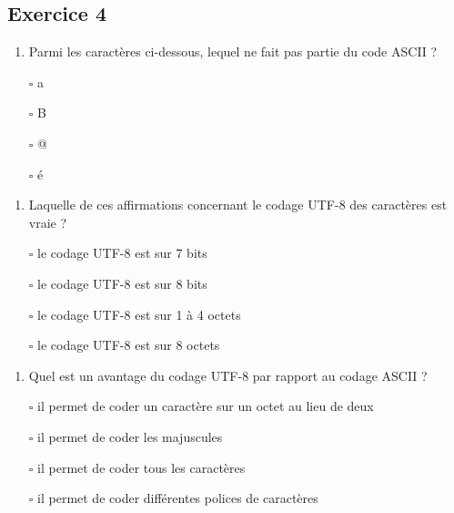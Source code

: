\documentclass[11pt,a4paper]{article}
\renewcommand{\theenumi}{\textbf{\arabic{enumi}}}
\renewcommand{\labelenumi}{\textbf{\theenumi.}}
\providecommand{\tightlist}{\setlength{\itemsep}{0pt}\setlength{\parskip}{0pt}}
\begin{document}
\hypertarget{octicons-pencil-16-exercice-4}{%
\subsection*{\faPencil* Exercice
4}\label{octicons-pencil-16-exercice-4}}

\begin{enumerate}
\def\labelenumi{\arabic{enumi}.}
\tightlist
\item
  Parmi les caractères ci-dessous, lequel ne fait pas partie du code
  ASCII ?
\end{enumerate}

\begin{itemize}
\tightlist
\item[$\square$]
  a
\item[$\square$]
  B
\item[$\square$]
  @
\item[$\square$]
  é
\end{itemize}

\begin{enumerate}
\def\labelenumi{\arabic{enumi}.}
\setcounter{enumi}{1}
\tightlist
\item
  Laquelle de ces affirmations concernant le codage UTF-8 des caractères
  est vraie ?
\end{enumerate}

\begin{itemize}
\tightlist
\item[$\square$]
  le codage UTF-8 est sur 7 bits
\item[$\square$]
  le codage UTF-8 est sur 8 bits
\item[$\square$]
  le codage UTF-8 est sur 1 à 4 octets
\item[$\square$]
  le codage UTF-8 est sur 8 octets
\end{itemize}

\begin{enumerate}
\def\labelenumi{\arabic{enumi}.}
\setcounter{enumi}{2}
\tightlist
\item
  Quel est un avantage du codage UTF-8 par rapport au codage ASCII ?
\end{enumerate}

\begin{itemize}
\tightlist
\item[$\square$]
  il permet de coder un caractère sur un octet au lieu de deux
\item[$\square$]
  il permet de coder les majuscules
\item[$\square$]
  il permet de coder tous les caractères
\item[$\square$]
  il permet de coder différentes polices de caractères
\end{itemize}
\end{document}
